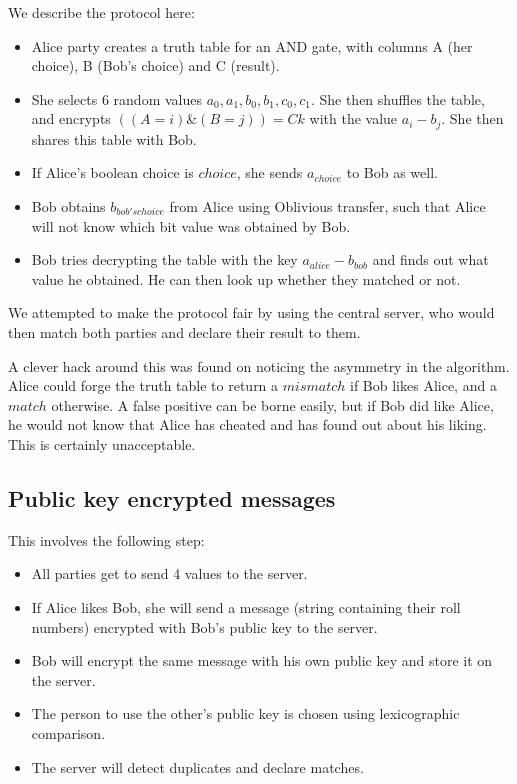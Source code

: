 \documentclass[sigtbd]{sigtbd-style}
\begin{document}
We describe the protocol here:
\begin{itemize}
\item Alice party creates a truth table for an AND gate, with columns
  A (her choice), B (Bob's choice) and C (result).
\item She selects 6 random values $a_0, a_1, b_0, b_1, c_0, c_1$. She
  then shuffles the table, and encrypts $((A = i) \& (B = j)) = Ck$
  with the value $a_i-b_j$. She then shares this table with Bob.
\item If Alice's boolean choice is $choice$, she sends $a_{choice}$ to
  Bob as well.
\item Bob obtains $b_{bob's choice}$ from Alice using Oblivious
  transfer, such that Alice will not know which bit value was obtained
  by Bob.
\item Bob tries decrypting the table with the key $a_{alice}-b_{bob}$
  and finds out what value he obtained. He can then look up whether
  they matched or not.
\end{itemize}

We attempted to make the protocol fair by using the central server,
who would then match both parties and declare their result to them.

A clever hack around this was found on noticing the asymmetry in the
algorithm. Alice could forge the truth table to return a $mismatch$ if
Bob likes Alice, and a $match$ otherwise. A false positive can be
borne easily, but if Bob did like Alice, he would not know that Alice
has cheated and has found out about his liking. This is certainly
unacceptable.

\subsection{Public key encrypted messages}
This involves the following step:
\begin{itemize}
\item All parties get to send 4 values to the server.
\item If Alice likes Bob, she will send a message (string containing
  their roll numbers) encrypted with Bob's
  public key to the server.
\item Bob will encrypt the same message with his own public key and
  store it on the server.
\item The person to use the other's public key is chosen using
  lexicographic comparison.
\item The server will detect duplicates and declare matches.
\end{itemize}
\end{document}
